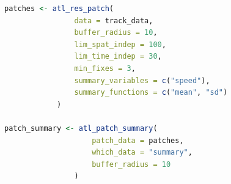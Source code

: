 \documentclass[10pt,paper=a4,headings=standardclasses
]{scrartcl}
\begin{document}
\begin{lstlisting}[float, language=R, style=customR, caption ={The \texttt{atl\_res\_patch} function can be used to classify a track into residence patches. The arguments \texttt{buffer\_radius} and \texttt{lim\_spat\_indep} are specified in metres, while the \texttt{lim\_time\_indep} is provided in minutes. In this example, specifying \texttt{summary\_variables = c("speed")}, and \texttt{summary\_functions = c("mean", "sd")} will provide the mean and standard deviation of instantaneous speed in each residence patch. The \texttt{atl\_patch\_summary} function is used to access the classified patch in one of three ways, here using the \texttt{summary} option which returns a table of patch-wise summary statistics.}]
patches <- atl_res_patch(
                data = track_data,
                buffer_radius = 10,
                lim_spat_indep = 100,
                lim_time_indep = 30,
                min_fixes = 3,
                summary_variables = c("speed"),
                summary_functions = c("mean", "sd")
            )
              
patch_summary <- atl_patch_summary(
                    patch_data = patches,
                    which_data = "summary",
                    buffer_radius = 10
                )
\end{lstlisting}
\end{document}
